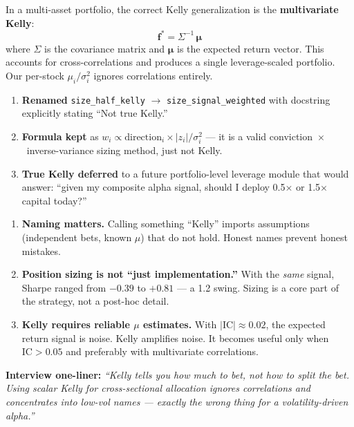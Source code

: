 \documentclass[a4paper, 11pt]{report}
\theoremstyle{definition}
\theoremstyle{remark}
\begin{document}
\begin{description}[style=nextline, leftmargin=1.8cm]
        \medskip
        In a multi-asset portfolio, the correct Kelly generalization
        is the \textbf{multivariate Kelly}:
        \[
            \mathbf{f}^* = \Sigma^{-1}\,\boldsymbol{\mu}
        \]
        where $\Sigma$ is the covariance matrix and $\boldsymbol{\mu}$
        is the expected return vector.  This accounts for
        cross-correlations and produces a single leverage-scaled
        portfolio.  Our per-stock $\mu_i / \sigma_i^2$ ignores
        correlations entirely.

    \item[Resolution]
        \begin{enumerate}[nosep]
            \item \textbf{Renamed} \texttt{size\_half\_kelly} $\to$
                  \texttt{size\_signal\_weighted} with docstring
                  explicitly stating ``Not true Kelly.''
            \item \textbf{Formula kept} as
                  $w_i \propto \mathrm{direction}_i \times |z_i| / \sigma_i^2$
                  --- it is a valid conviction~$\times$~inverse-variance
                  sizing method, just not Kelly.
            \item \textbf{True Kelly deferred} to a future portfolio-level
                  leverage module that would answer: ``given my
                  composite alpha signal, should I deploy 0.5$\times$
                  or 1.5$\times$ capital today?''
        \end{enumerate}

    \item[Why It Matters]
        \begin{enumerate}[nosep]
            \item \textbf{Naming matters.}  Calling something ``Kelly''
                  imports assumptions (independent bets, known $\mu$)
                  that do not hold.  Honest names prevent honest mistakes.
            \item \textbf{Position sizing is not ``just implementation.''}
                  With the \emph{same} signal, Sharpe ranged from
                  $-0.39$ to $+0.81$ --- a 1.2 swing.  Sizing is
                  a core part of the strategy, not a post-hoc detail.
            \item \textbf{Kelly requires reliable $\mu$ estimates.}
                  With $|\mathrm{IC}| \approx 0.02$, the expected
                  return signal is noise.  Kelly amplifies noise.
                  It becomes useful only when $\mathrm{IC} > 0.05$
                  and preferably with multivariate correlations.
        \end{enumerate}

        \medskip
        \textbf{Interview one-liner:}
        \emph{``Kelly tells you how much to bet, not how to split
        the bet.  Using scalar Kelly for cross-sectional allocation
        ignores correlations and concentrates into low-vol names ---
        exactly the wrong thing for a volatility-driven alpha.''}
\end{description}
\end{document}
